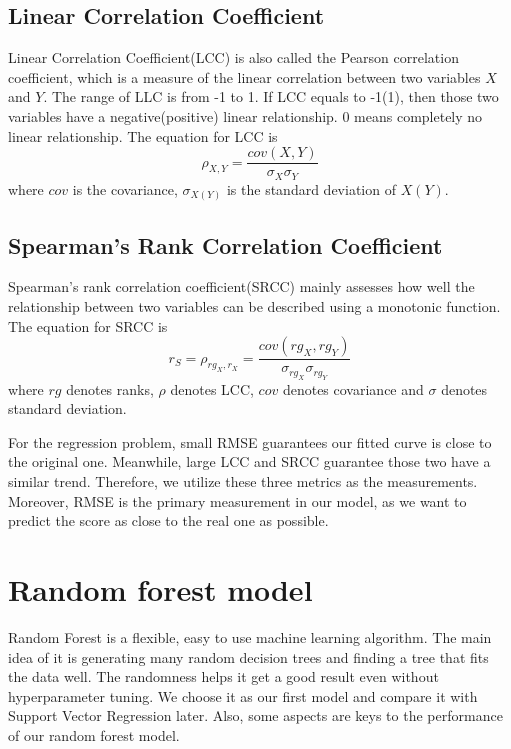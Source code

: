 \documentclass[10pt,conference,compsocconf]{IEEEtran}
\begin{document}
\subsection{Linear Correlation Coefficient}
Linear Correlation Coefficient(LCC) is also called the Pearson correlation coefficient, which is a measure of the linear correlation between two variables $X$ and $Y$. The range of LLC is from -1 to 1. If LCC equals to -1(1), then those two variables have a negative(positive) linear relationship. 0 means completely no linear relationship. The equation for LCC is
\begin{equation}
    \rho_{X, Y} = \frac{cov(X, Y)}{\sigma_X \sigma_Y }
\end{equation}
where $cov$ is the covariance, $\sigma_{X(Y)}$ is the standard deviation of $X(Y)$.

\subsection{Spearman's Rank Correlation Coefficient}
Spearman's rank correlation coefficient(SRCC) mainly assesses how well the relationship between two variables can be described using a monotonic function. The equation for SRCC is
\begin{equation}
    r_S = \rho_{rg_X,r_X} = \frac{cov(rg_X, rg_Y)}{\sigma_{rg_X} \sigma_{rg_Y}}
\end{equation}
where $rg$ denotes ranks, $\rho$ denotes LCC, $cov$ denotes covariance and $\sigma$ denotes standard deviation.

For the regression problem, small RMSE guarantees our fitted curve is close to the original one. Meanwhile, large LCC and SRCC guarantee those two have a similar trend. Therefore, we utilize these three metrics as the measurements. Moreover, RMSE is the primary measurement in our model, as we want to predict the score as close to the real one as possible.

\section{Random forest model}
Random Forest is a flexible, easy to use machine learning algorithm. The main idea of it is generating many random decision trees and finding a tree that fits the data well. The randomness helps it get a good result even without hyperparameter tuning. We choose it as our first model and compare it with Support Vector Regression later. Also, some aspects are keys to the performance of our random forest model.
\end{document}
